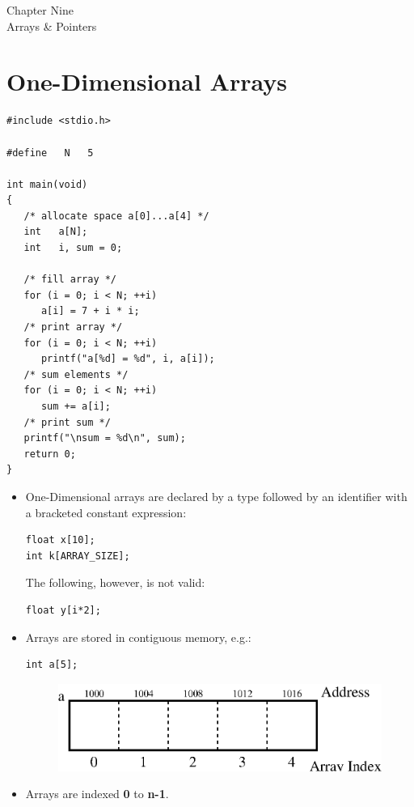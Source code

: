 \documentclass[a4,portraitt]{slides}
\begin{document}
\newpage
{\samepage
\begin{center}
{\Large Chapter Nine \\ Arrays \& Pointers}
\end{center}

\newpage
\section*{One-Dimensional Arrays}
\begin{verbatim}
#include <stdio.h>

#define   N   5

int main(void)
{
   /* allocate space a[0]...a[4] */
   int   a[N];
   int   i, sum = 0;

   /* fill array */
   for (i = 0; i < N; ++i)
      a[i] = 7 + i * i;
   /* print array */
   for (i = 0; i < N; ++i)
      printf("a[%d] = %d", i, a[i]);
   /* sum elements */
   for (i = 0; i < N; ++i)
      sum += a[i];
   /* print sum */
   printf("\nsum = %d\n", sum);
   return 0;
}
\end{verbatim}
}
\newpage
\begin{itemize}
\item One-Dimensional arrays are declared by a type
followed by an identifier with a bracketed constant expression:
\vspace{-1em}
\begin{verbatim}
float x[10];
int k[ARRAY_SIZE];
\end{verbatim}
\vspace{-1em}
The following, however, is not valid:
\vspace{-1em}
\begin{verbatim}
float y[i*2];
\end{verbatim}
\vspace{-1em}
\item Arrays are stored in contiguous memory, e.g.:
\vspace{-1em}
\begin{verbatim}
int a[5];
\end{verbatim}
\vspace{-1em}
\begin{center}
\begin{figure}[h]
\centerline{
\includegraphics{../Figs/array9_1.eps}
}
\end{figure}
\end{center}
\item Arrays are indexed {\bf 0} to {\bf n-1}.
\end{itemize}
\newpage
\end{document}
